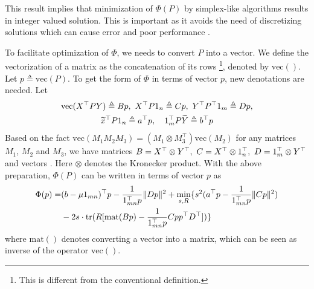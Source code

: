 \documentclass[11pt,bezier,]{article}
\begin{document}
This result implies that minimization of $\Phi(P)$ 
by simplex-like algorithms results in integer valued solution.
This is important  as it avoids the need of discretizing solutions
which can cause error
and poor performance 
\cite{LP_edge}. %



To facilitate optimization of $\Phi$, %
we needs to convert  $P$  into a vector.
We define the vectorization of a matrix as the concatenation of its rows
\footnote{This is different from the conventional definition.},
denoted by $\text{vec}()$.
Let $p\triangleq\text{vec}(P)$.
To get the form of $\Phi$ in terms of vector $p$,
new denotations are needed.
Let
\begin{gather}
 \text{vec}(X^\top PY)\triangleq B  p,\
 X^\top P 1_n\triangleq C  p, \
 Y^\top P^\top  1_m\triangleq D p,    \notag\\ 
  {\widetilde x}^\top P  1_n\triangleq   a^\top  p, \quad
 1_m^\top P \widetilde Y \triangleq b^\top p  \notag
\end{gather}
Based on the fact $\text{vec}(M_1 M_2 M_3)= (M_1\otimes M_3^\top)\text{vec}(M_2)$ for any matrices  $M_1$, $M_2$ and $M_3$,
we have matrices
$
B=X^\top\otimes Y^\top,\ C=X^\top\otimes  1_n^\top,\ D= 1_m^\top\otimes Y^\top  \notag
$
 and vectors
\scalebox{1.1}{
$
  a= {\widetilde x} \otimes  1_n,\
b=1_m \otimes \widetilde y  \notag
$}.
Here $\otimes$ denotes the Kronecker product.
With the above preparation, 
$\Phi(P)$  can be written in terms of vector $ p$ as
\begin{align}
\Phi( p)=&  
(b-\mu 1_{mn})^\top   p  - \frac{1}{1_{mn}^\top p} \|D  p \|^2  %
 + \min_{s,R} \{s^2 ( a^\top  p    - \frac{1}{1_{mn}^\top p}    \| C  p \|^2 )  \notag\\
&- 2s\cdot \text{tr}(R [ \text{mat} (B p)  - \frac{1}{1_{mn}^\top p} C p  p^\top D^\top ]) \} \label{phi_p}
\end{align}
where $\text{mat}()$ denotes converting a vector into a matrix,
which can be seen as  inverse of the operator  $\text{vec}()$.
\end{document}
